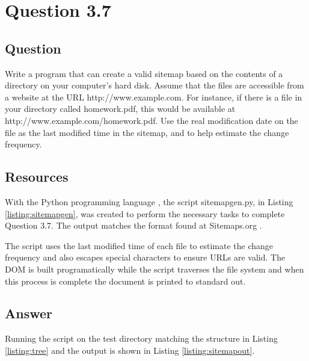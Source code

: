 \section{Question 3.7}

\subsection{Question}
Write a program that can create a valid sitemap based on the contents of a directory on your computer's hard disk. Assume that the files are accessible from a website at the URL http://www.example.com. For instance, if there is a file in your directory called homework.pdf, this would be available at http://www.example.com/homework.pdf. Use the real modification date on the file as the last modified time in the sitemap, and to help estimate the change frequency.

\subsection{Resources}
With the Python programming language \cite{python}, the script {\ttfamily sitemapgen.py}, in Listing \ref{listing:sitemapgen}, was created to perform the necessary tasks to complete Question 3.7.  The output matches the format found at Sitemaps.org \cite{sitemaps}.

The script uses the last modified time of each file to estimate the change frequency and also escapes special characters to ensure URLs are valid.  The DOM is built programatically while the script traverses the file system and when this process is complete the document is printed to standard out.

\subsection{Answer}
Running the script on the test directory matching the structure in Listing \ref{listing:tree} and the output is shown in Listing \ref{listing:sitemapout}.






